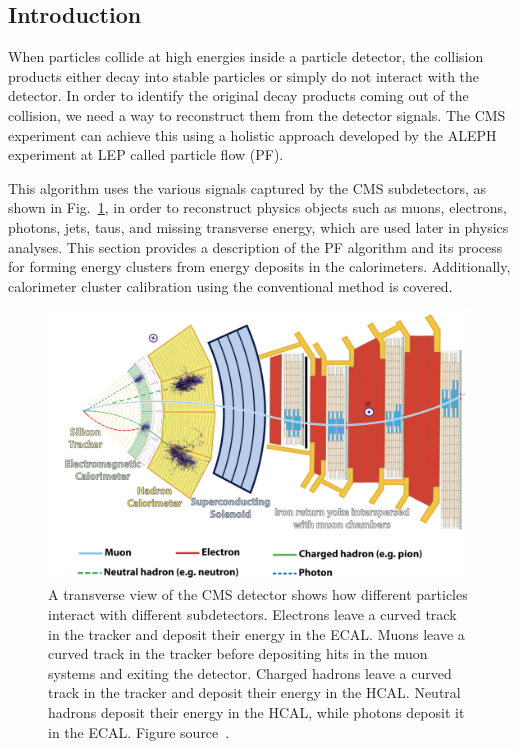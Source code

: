 \subsection{Introduction}
When particles collide at high energies inside a particle detector, the collision products either decay into stable particles or simply do not interact with the detector.
In order to identify the original decay products coming out of the collision, we need a way to reconstruct them from the detector signals.
The CMS experiment can achieve this using a holistic approach developed by the ALEPH experiment at LEP called particle flow (PF).

This algorithm uses the various signals captured by the CMS subdetectors, as shown in Fig.~\ref{fig:Particles_in_CMS}, in order to reconstruct physics objects such as muons, electrons, photons, jets, taus, and missing transverse energy, which are used later in physics analyses.
This section provides a description of the PF algorithm and its process for forming energy clusters from energy deposits in the calorimeters.
Additionally, calorimeter cluster calibration using the conventional method is covered.

\begin{figure}[t!]
\centering
\includegraphics[width=0.99\textwidth]{figures/particles_signture_in_detector.png}
\caption[Transverse view of the CMS detector]
        {A transverse view of the CMS detector shows how different particles interact with different subdetectors.
          Electrons leave a curved track in the tracker and deposit their energy in the ECAL.
          Muons leave a curved track in the tracker before depositing hits in the muon systems and exiting the detector.
          Charged hadrons leave a curved track in the tracker and deposit their energy in the HCAL.
          Neutral hadrons deposit their energy in the HCAL, while photons deposit it in the ECAL. Figure source~\cite{PF}.}
\label{fig:Particles_in_CMS}
\end{figure}

